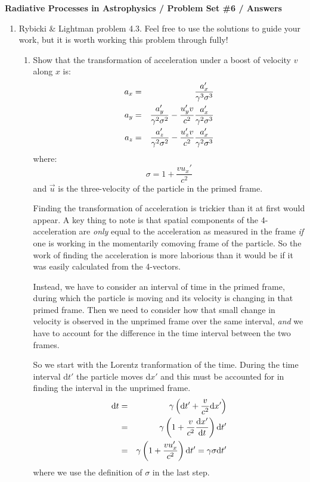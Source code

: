 \documentclass[11pt, preprint]{article}
\begin{document}
\begin{center}
  {\bf Radiative Processes in Astrophysics / Problem Set \#6 /
    Answers}
\end{center}

\begin{enumerate}
\item Rybicki \& Lightman problem 4.3. Feel free to use the solutions
  to guide your work, but it is worth working this problem through
  fully!

  \begin{enumerate}
    \item Show that the transformation of acceleration under a boost
      of velocity $v$ along $x$ is:
      \begin{eqnarray}
        a_x &=& \frac{a_x'}{\gamma^3 \sigma^3} \cr
        a_y &=& \frac{a_y'}{\gamma^2 \sigma^2} - \frac{u_y' v}{c^2}
        \frac{a_x'}{\gamma^2 \sigma^3}\cr
        a_z &=& \frac{a_z'}{\gamma^2 \sigma^2} - \frac{u_z' v}{c^2}
        \frac{a_x'}{\gamma^2 \sigma^3}
      \end{eqnarray}
      where:
      \begin{equation}
        \sigma = 1 + \frac{v u_x'}{c^2}
      \end{equation}
      and $\vec{u}$ is the three-velocity of the particle in the
      primed frame.
      
      \begin{answer}
        Finding the transformation of acceleration is trickier than it
        at first would appear. A key thing to note is that spatial
        components of the 4-acceleration are {\it only} equal to the
        acceleration as measured in the frame {\it if} one is working
        in the momentarily comoving frame of the particle. So the work
        of finding the acceleration is more laborious than it would be
        if it was easily calculated from the 4-vectors.

        Instead, we have to consider an interval of time in the primed
        frame, during which the particle is moving and its velocity is
        changing in that primed frame.  Then we need to consider how
        that small change in velocity is observed in the unprimed
        frame over the same interval, {\it and} we have to account for
        the difference in the time interval between the two frames.

        So we start with the Lorentz tranformation of the time. During
        the time interval d$t'$ the particle moves d$x'$ and this must
        be accounted for in finding the interval in the unprimed frame.
        \begin{eqnarray}
          {\rm d}t &=& \gamma\left({\rm d}t' + \frac{v}{c^2} {\rm
            d}x'\right) \cr
          &=& \gamma\left(1 + \frac{v}{c^2} \frac{{\rm d}x'}{{\rm d}t}\right)
            {\rm d}t'\cr
          &=& \gamma\left(1 + \frac{v u_x'}{c^2}\right)
            {\rm d}t' = \gamma \sigma {\rm d}t'
        \end{eqnarray}
        where we use the definition of $\sigma$ in the last step.


\end{answer}
\end{enumerate}
\end{enumerate}
\end{document}
